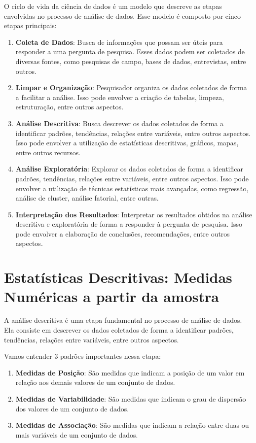\documentclass[
  letterpaper,
  DIV=11,
  numbers=noendperiod]{scrreprt}
\begin{document}
O ciclo de vida da ciência de dados é um modelo que descreve as etapas
envolvidas no processo de análise de dados. Esse modelo é composto por
cinco etapas principais:

\begin{enumerate}
\def\labelenumi{\arabic{enumi}.}
\item
  \textbf{Coleta de Dados}: Busca de informações que possam ser úteis
  para responder a uma pergunta de pesquisa. Esses dados podem ser
  coletados de diversas fontes, como pesquisas de campo, bases de dados,
  entrevistas, entre outros.
\item
  \textbf{Limpar e Organização}: Pesquisador organiza os dados coletados
  de forma a facilitar a análise. Isso pode envolver a criação de
  tabelas, limpeza, estruturação, entre outros aspectos.
\item
  \textbf{Análise Descritiva}: Busca descrever os dados coletados de
  forma a identificar padrões, tendências, relações entre variáveis,
  entre outros aspectos. Isso pode envolver a utilização de estatísticas
  descritivas, gráficos, mapas, entre outros recursos.
\item
  \textbf{Análise Exploratória}: Explorar os dados coletados de forma a
  identificar padrões, tendências, relações entre variáveis, entre
  outros aspectos. Isso pode envolver a utilização de técnicas
  estatísticas mais avançadas, como regressão, análise de cluster,
  análise fatorial, entre outras.
\item
  \textbf{Interpretação dos Resultados}: Interpretar os resultados
  obtidos na análise descritiva e exploratória de forma a responder à
  pergunta de pesquisa. Isso pode envolver a elaboração de conclusões,
  recomendações, entre outros aspectos.
\end{enumerate}

\section{Estatísticas Descritivas: Medidas Numéricas a partir da
amostra}\label{estatuxedsticas-descritivas-medidas-numuxe9ricas-a-partir-da-amostra}

A análise descritiva é uma etapa fundamental no processo de análise de
dados. Ela consiste em descrever os dados coletados de forma a
identificar padrões, tendências, relações entre variáveis, entre outros
aspectos.

Vamos entender 3 padrões importantes nessa etapa:

\begin{enumerate}
\def\labelenumi{\arabic{enumi}.}
\item
  \textbf{Medidas de Posição}: São medidas que indicam a posição de um
  valor em relação aos demais valores de um conjunto de dados.
\item
  \textbf{Medidas de Variabilidade}: São medidas que indicam o grau de
  dispersão dos valores de um conjunto de dados.
\item
  \textbf{Medidas de Associação}: São medidas que indicam a relação
  entre duas ou mais variáveis de um conjunto de dados.
\end{enumerate}
\end{document}
